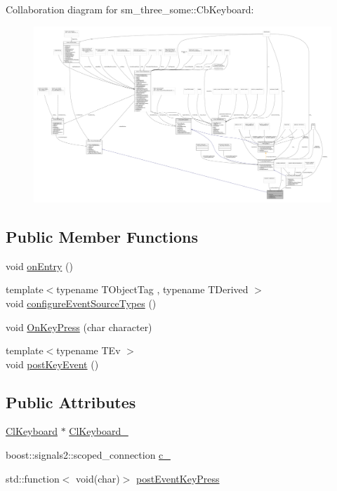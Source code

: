 Collaboration diagram for sm\+\_\+three\+\_\+some\+:\+:Cb\+Keyboard\+:
\nopagebreak
\begin{figure}[H]
\begin{center}
\leavevmode
\includegraphics[width=350pt]{classsm__three__some_1_1CbKeyboard__coll__graph}
\end{center}
\end{figure}
\subsection*{Public Member Functions}
\begin{DoxyCompactItemize}
\item 
void \hyperlink{classsm__three__some_1_1CbKeyboard_af5fe2932db5f471afa125cae35362ba7}{on\+Entry} ()
\item 
{\footnotesize template$<$typename T\+Object\+Tag , typename T\+Derived $>$ }\\void \hyperlink{classsm__three__some_1_1CbKeyboard_a868ad517e8faf2408391f9607e5de33c}{configure\+Event\+Source\+Types} ()
\item 
void \hyperlink{classsm__three__some_1_1CbKeyboard_a28bdbe8a69cabc44933f601061331cbf}{On\+Key\+Press} (char character)
\item 
{\footnotesize template$<$typename T\+Ev $>$ }\\void \hyperlink{classsm__three__some_1_1CbKeyboard_a02cbcf0db3b509c78b545e9f1d3ef313}{post\+Key\+Event} ()
\end{DoxyCompactItemize}
\subsection*{Public Attributes}
\begin{DoxyCompactItemize}
\item 
\hyperlink{classsm__three__some_1_1ClKeyboard}{Cl\+Keyboard} $\ast$ \hyperlink{classsm__three__some_1_1CbKeyboard_adbbfdbe9e4dc267a55e85f19683131fc}{Cl\+Keyboard\+\_\+}
\item 
boost\+::signals2\+::scoped\+\_\+connection \hyperlink{classsm__three__some_1_1CbKeyboard_a6b6a885c39f32f29e907cfbc37b08b6f}{c\+\_\+}
\item 
std\+::function$<$ void(char)$>$ \hyperlink{classsm__three__some_1_1CbKeyboard_a746c413234e920c55625d63f4a6be784}{post\+Event\+Key\+Press}
\end{DoxyCompactItemize}


